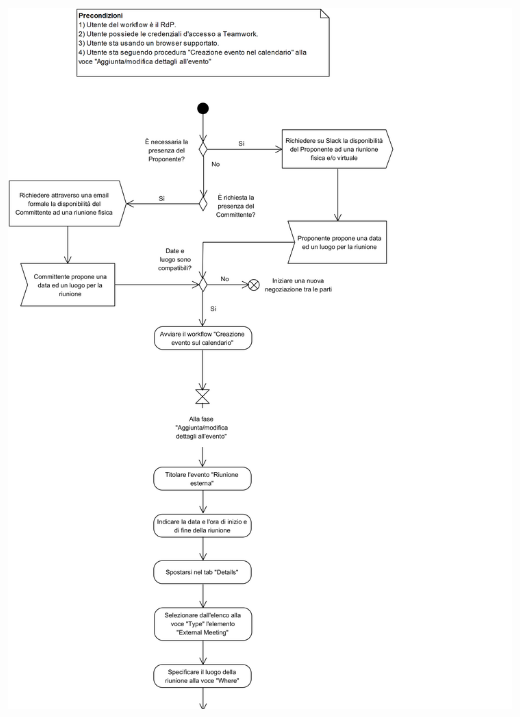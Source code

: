 \begin{samepage}
	\mbox{}\\
	
	\begin{center}
		\includegraphics[width=14cm]{../../documenti/NormeDiProgetto/DiagrammiProcedure/RiunioneEsterna1.png}
	\end{center}
\end{samepage}

